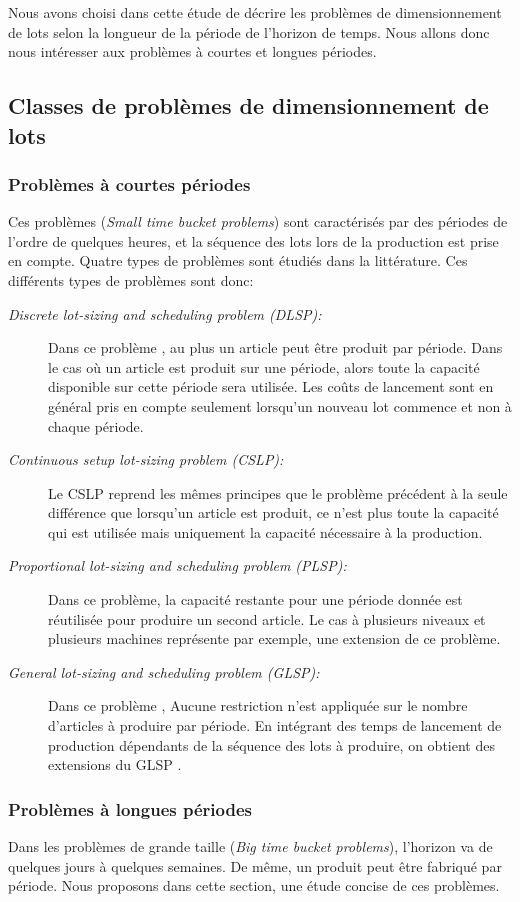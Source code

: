 	Nous avons choisi dans cette étude de décrire les problèmes de dimensionnement de lots selon la longueur de la période de l'horizon de temps. Nous allons donc nous intéresser aux problèmes à courtes et longues périodes.
\subsection{Classes de problèmes de dimensionnement de lots}
	\subsubsection{Problèmes à courtes périodes}
	Ces problèmes (\emph{Small time bucket problems}) sont caractérisés par des périodes de l'ordre de quelques heures, et la séquence des lots lors de la production est prise en compte. Quatre types de problèmes sont étudiés dans la littérature. Ces différents types de problèmes sont donc:
	\begin{description}
		\item[\textsl{Discrete lot-sizing and scheduling problem (DLSP):}] Dans ce problème \cite{fleischmann}, au plus un article peut être produit par période. Dans le cas où un article est produit sur une période, alors toute la capacité disponible sur cette période sera utilisée. Les coûts de lancement sont en général pris en compte seulement lorsqu'un nouveau lot commence et non à chaque période.
		\item[\textsl{Continuous setup lot-sizing problem (CSLP):}]
		Le CSLP reprend les mêmes principes que le problème précédent à la seule différence que lorsqu'un article est produit, ce n'est plus toute la capacité qui est utilisée mais uniquement la capacité nécessaire à la production.
		\item[\textsl{Proportional lot-sizing and scheduling problem (PLSP):}] 
		Dans ce problème, la capacité restante pour une période donnée est réutilisée pour produire un second article. Le cas à plusieurs niveaux et plusieurs machines représente par exemple, une extension de ce problème. 
		\item[\textsl{General lot-sizing and scheduling problem (GLSP):}] 
		Dans ce problème \cite{fleischmann_meyr}, Aucune restriction n'est appliquée sur le nombre d'articles à produire par période. En intégrant des temps de lancement de production dépendants de la séquence des lots à produire, on obtient des extensions du GLSP \cite{meyr}.
	\end{description}
	
	\subsubsection{Problèmes à longues périodes}
	Dans les problèmes de grande taille (\emph{Big time bucket problems}), l'horizon va de quelques jours à quelques semaines. De même, un produit peut être fabriqué par période. Nous proposons dans cette section, une étude concise de ces problèmes.
	
